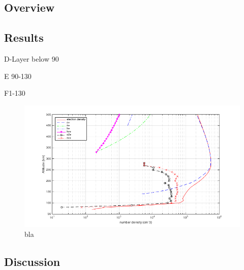 \subsection{Overview}
\subsection{Results}
D-Layer below 90

E 90-130

F1-130
\begin{figure}[h]
	\centering
	\includegraphics[width=\linewidth]{images/ass5_properties_plot}	
	\caption{bla}
	\label{fig:ass5Plot}
\end{figure}


\subsection{Discussion}

